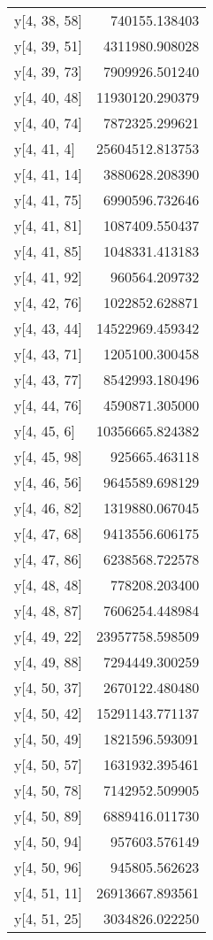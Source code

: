 \begin{longtable}{lr}
y[4, 38, 58] & 740155.138403 \\
y[4, 39, 51] & 4311980.908028 \\
y[4, 39, 73] & 7909926.501240 \\
y[4, 40, 48] & 11930120.290379 \\
y[4, 40, 74] & 7872325.299621 \\
y[4, 41, 4] & 25604512.813753 \\
y[4, 41, 14] & 3880628.208390 \\
y[4, 41, 75] & 6990596.732646 \\
y[4, 41, 81] & 1087409.550437 \\
y[4, 41, 85] & 1048331.413183 \\
y[4, 41, 92] & 960564.209732 \\
y[4, 42, 76] & 1022852.628871 \\
y[4, 43, 44] & 14522969.459342 \\
y[4, 43, 71] & 1205100.300458 \\
y[4, 43, 77] & 8542993.180496 \\
y[4, 44, 76] & 4590871.305000 \\
y[4, 45, 6] & 10356665.824382 \\
y[4, 45, 98] & 925665.463118 \\
y[4, 46, 56] & 9645589.698129 \\
y[4, 46, 82] & 1319880.067045 \\
y[4, 47, 68] & 9413556.606175 \\
y[4, 47, 86] & 6238568.722578 \\
y[4, 48, 48] & 778208.203400 \\
y[4, 48, 87] & 7606254.448984 \\
y[4, 49, 22] & 23957758.598509 \\
y[4, 49, 88] & 7294449.300259 \\
y[4, 50, 37] & 2670122.480480 \\
y[4, 50, 42] & 15291143.771137 \\
y[4, 50, 49] & 1821596.593091 \\
y[4, 50, 57] & 1631932.395461 \\
y[4, 50, 78] & 7142952.509905 \\
y[4, 50, 89] & 6889416.011730 \\
y[4, 50, 94] & 957603.576149 \\
y[4, 50, 96] & 945805.562623 \\
y[4, 51, 11] & 26913667.893561 \\
y[4, 51, 25] & 3034826.022250 \\

\end{longtable}
